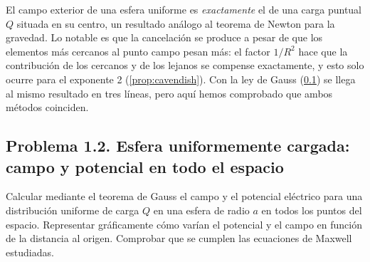 \begin{observacion}[Interpretación]
El campo exterior de una esfera uniforme es \emph{exactamente} el de una carga puntual $Q$ situada en su centro, un resultado análogo al teorema de Newton para la gravedad. Lo notable es
que la cancelación se produce a pesar de que los elementos más cercanos al punto campo pesan más: el factor $1/R^{2}$ hace que la contribución de los cercanos y de los lejanos se compense exactamente,
y esto solo ocurre para el exponente 2 (\cref{prop:cavendish}). Con la ley de Gauss (\cref{sem:esfera}) se llega al mismo resultado en tres líneas, pero aquí hemos comprobado que ambos métodos coinciden.
\end{observacion}



\subsection{Problema 1.2. Esfera uniformemente cargada: campo y potencial en todo el espacio}\label{sem:esfera}
\begin{ejercicio}\label{ejer:esfera}
Calcular mediante el teorema de Gauss el campo y el potencial eléctrico para una distribución uniforme de carga $Q$ en una esfera de radio $a$ en todos los puntos del espacio.
Representar gráficamente cómo varían el potencial y el campo en función de la distancia al origen. Comprobar que se cumplen las ecuaciones de Maxwell estudiadas.
\end{ejercicio}

